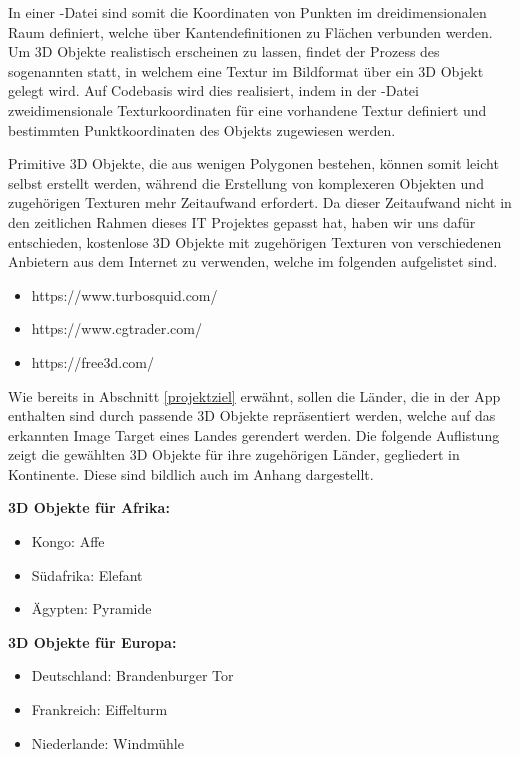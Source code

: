 In einer  -Datei sind somit die Koordinaten von Punkten im dreidimensionalen Raum definiert, welche über Kantendefinitionen zu Flächen verbunden werden. 
Um 3D Objekte realistisch erscheinen zu lassen, findet der Prozess des sogenannten  statt, in welchem eine Textur im Bildformat über ein 3D Objekt gelegt wird. 
Auf Codebasis wird dies realisiert, indem in der -Datei zweidimensionale Texturkoordinaten für eine vorhandene Textur definiert und bestimmten Punktkoordinaten des Objekts zugewiesen werden.

Primitive 3D Objekte, die aus wenigen Polygonen bestehen, können somit leicht selbst erstellt werden, während die Erstellung von komplexeren Objekten und zugehörigen Texturen mehr Zeitaufwand erfordert. 
Da dieser Zeitaufwand nicht in den zeitlichen Rahmen dieses IT Projektes gepasst hat, haben wir uns dafür entschieden, kostenlose 3D Objekte mit zugehörigen Texturen von verschiedenen Anbietern aus dem Internet zu verwenden, welche im folgenden aufgelistet sind.

\begin{itemize}
\item https://www.turbosquid.com/
\item https://www.cgtrader.com/
\item https://free3d.com/
\end{itemize}

Wie bereits in Abschnitt \ref{projektziel} erwähnt, sollen die Länder, die in der App enthalten sind durch passende 3D Objekte repräsentiert werden, welche auf das erkannten Image Target eines Landes gerendert werden. 
Die folgende Auflistung zeigt die gewählten 3D Objekte für ihre zugehörigen Länder, gegliedert in Kontinente. Diese sind bildlich auch im Anhang dargestellt.

\textbf{3D Objekte für Afrika:}
\begin{itemize}
\item Kongo: Affe
\item Südafrika: Elefant
\item Ägypten: Pyramide
\end{itemize}

\textbf{3D Objekte für Europa:}
\begin{itemize}
\item Deutschland: Brandenburger Tor	
\item Frankreich: Eiffelturm
\item Niederlande: Windmühle
\end{itemize}


